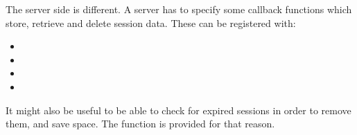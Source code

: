\par
The server side is different. A server has to specify some callback functions
which store, retrieve and delete session data. These can be registered with:
\begin{itemize}
\item {}
\item {}
\item {}
\item {}
\end{itemize}

\par
It might also be useful to be able to check for expired sessions in order to remove 
them, and save space. The function
 is provided for that
reason.


